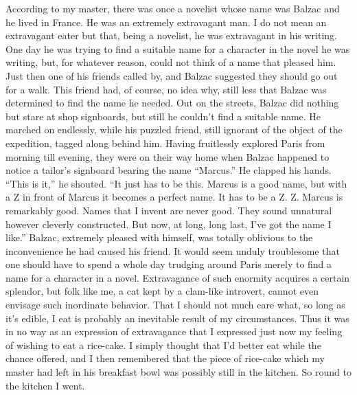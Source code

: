 \documentclass{book}
\begin{document}
According to my master, there was once a novelist whose name was Balzac
and he lived in France. He was an extremely extravagant man. I do not
mean an extravagant eater but that, being a novelist, he was extravagant
in his writing. One day he was trying to find a suitable name for a
character in the novel he was writing, but, for whatever reason, could
not think of a name that pleased him. Just then one of his friends
called by, and Balzac suggested they should go out for a walk. This
friend had, of course, no idea why, still less that Balzac was
determined to find the name he needed. Out on the streets, Balzac did
nothing but stare at shop signboards, but still he couldn't find a
suitable name. He marched on endlessly, while his puzzled friend, still
ignorant of the object of the expedition, tagged along behind him.
Having fruitlessly explored Paris from morning till evening, they were
on their way home when Balzac happened to notice a tailor's signboard
bearing the name ``Marcus.'' He clapped his hands. ``This is it,'' he
shouted. ``It just has to be this. Marcus is a good name, but with a Z
in front of Marcus it becomes a perfect name. It has to be a Z. Z.
Marcus is remarkably good. Names that I invent are never good. They
sound unnatural however cleverly constructed. But now, at long, long
last, I've got the name I like.'' Balzac, extremely pleased with
himself, was totally oblivious to the inconvenience he had caused his
friend. It would seem unduly troublesome that one should have to spend a
whole day trudging around Paris merely to find a name for a character in
a novel. Extravagance of such enormity acquires a certain splendor, but
folk like me, a cat kept by a clam-like introvert, cannot even envisage
such inordinate behavior. That I should not much care what, so long as
it's edible, I eat is probably an inevitable result of my circumstances.
Thus it was in no way as an expression of extravagance that I expressed
just now my feeling of wishing to eat a rice-cake. I simply thought that
I'd better eat while the chance offered, and I then remembered that the
piece of rice-cake which my master had left in his breakfast bowl was
possibly still in the kitchen. So round to the kitchen I went.
\end{document}
